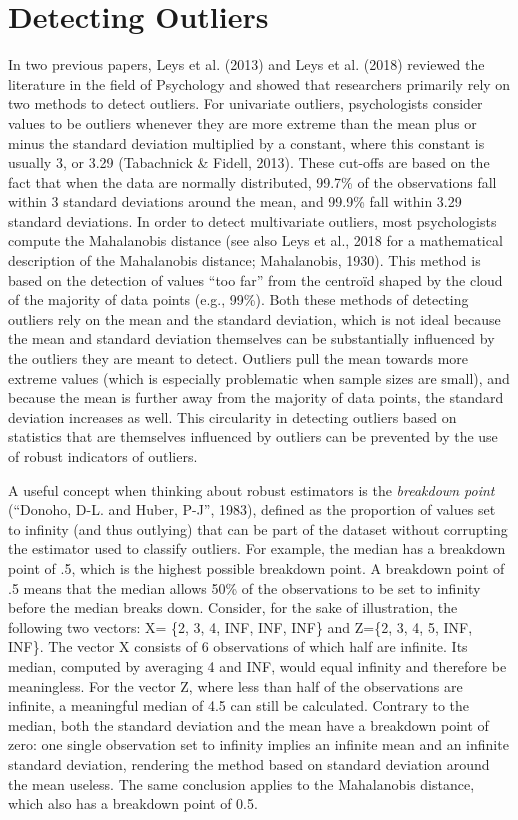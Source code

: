 \documentclass[man,floatsintext]{apa6}
\begin{document}
\section{Detecting Outliers}\label{detecting-outliers}

In two previous papers, Leys et al. (2013) and Leys et al. (2018)
reviewed the literature in the field of Psychology and showed that
researchers primarily rely on two methods to detect outliers. For
univariate outliers, psychologists consider values to be outliers
whenever they are more extreme than the mean plus or minus the standard
deviation multiplied by a constant, where this constant is usually 3, or
3.29 (Tabachnick \& Fidell, 2013). These cut-offs are based on the fact
that when the data are normally distributed, 99.7\% of the observations
fall within 3 standard deviations around the mean, and 99.9\% fall
within 3.29 standard deviations. In order to detect multivariate
outliers, most psychologists compute the Mahalanobis distance (see also
Leys et al., 2018 for a mathematical description of the Mahalanobis
distance; Mahalanobis, 1930). This method is based on the detection of
values \enquote{too far} from the centroïd shaped by the cloud of the
majority of data points (e.g., 99\%). Both these methods of detecting
outliers rely on the mean and the standard deviation, which is not ideal
because the mean and standard deviation themselves can be substantially
influenced by the outliers they are meant to detect. Outliers pull the
mean towards more extreme values (which is especially problematic when
sample sizes are small), and because the mean is further away from the
majority of data points, the standard deviation increases as well. This
circularity in detecting outliers based on statistics that are
themselves influenced by outliers can be prevented by the use of robust
indicators of outliers.

A useful concept when thinking about robust estimators is the
\emph{breakdown point} (``Donoho, D-L. and Huber, P-J'', 1983), defined
as the proportion of values set to infinity (and thus outlying) that can
be part of the dataset without corrupting the estimator used to classify
outliers. For example, the median has a breakdown point of .5, which is
the highest possible breakdown point. A breakdown point of .5 means that
the median allows 50\% of the observations to be set to infinity before
the median breaks down. Consider, for the sake of illustration, the
following two vectors: X= \{2, 3, 4, INF, INF, INF\} and Z=\{2, 3, 4, 5,
INF, INF\}. The vector X consists of 6 observations of which half are
infinite. Its median, computed by averaging 4 and INF, would equal
infinity and therefore be meaningless. For the vector Z, where less than
half of the observations are infinite, a meaningful median of 4.5 can
still be calculated. Contrary to the median, both the standard deviation
and the mean have a breakdown point of zero: one single observation set
to infinity implies an infinite mean and an infinite standard deviation,
rendering the method based on standard deviation around the mean
useless. The same conclusion applies to the Mahalanobis distance, which
also has a breakdown point of 0.5.
\end{document}

